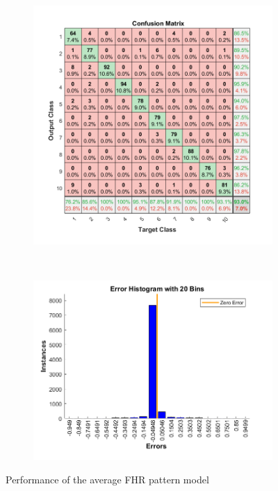 \documentclass[11pt,a4paper]{article}
\begin{document}
\begin{figure}[htb]
  \centering
  \begin{subfigure}[b]{0.48\textwidth}
    \centering
    \includegraphics[width=\textwidth]{figures/CLASS/avg_conf_matrix.png}
  \end{subfigure}
  ~
  \begin{subfigure}[b]{0.48\textwidth}
    \centering
    \includegraphics[width=\textwidth]{figures/CLASS/avg_err_hist.png}
  \end{subfigure}
  \caption{Performance of the average FHR pattern model}
  \label{fig:CLASS_AVG}
\end{figure}
\end{document}
